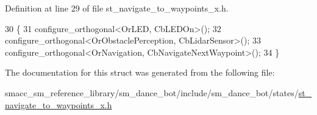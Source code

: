 Definition at line 29 of file st\+\_\+navigate\+\_\+to\+\_\+waypoints\+\_\+x.\+h.


\begin{DoxyCode}
30   \{
31     configure\_orthogonal<OrLED, CbLEDOn>();
32     configure\_orthogonal<OrObstaclePerception, CbLidarSensor>();
33     configure\_orthogonal<OrNavigation, CbNavigateNextWaypoint>();
34   \}
\end{DoxyCode}


The documentation for this struct was generated from the following file\+:\begin{DoxyCompactItemize}
\item 
smacc\+\_\+sm\+\_\+reference\+\_\+library/sm\+\_\+dance\+\_\+bot/include/sm\+\_\+dance\+\_\+bot/states/\hyperlink{include_2sm__dance__bot_2states_2st__navigate__to__waypoints__x_8h}{st\+\_\+navigate\+\_\+to\+\_\+waypoints\+\_\+x.\+h}\end{DoxyCompactItemize}
